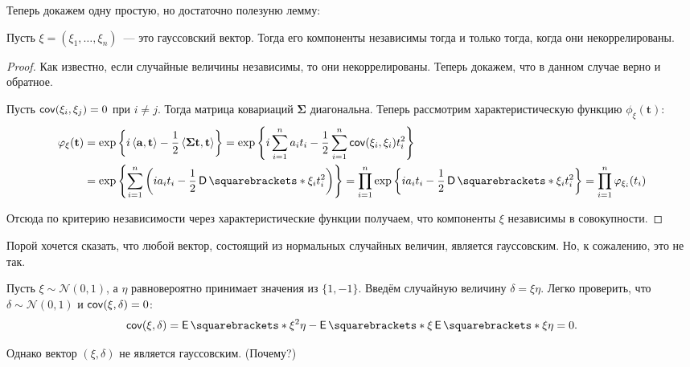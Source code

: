 Теперь докажем одну простую, но достаточно полезуню лемму:
\begin{lemma}
	Пусть \(\xi = (\xi_1, \dots, \xi_n)\)~--- это гауссовский вектор. Тогда его компоненты независимы тогда и только тогда, когда они некоррелированы.
\end{lemma}
\begin{proof}
	Как известно, если случайные величины независимы, то они некоррелированы. Теперь докажем, что в данном случае верно и обратное.
	
	Пусть \(\operatorname{\mathsf{cov}}(\xi_i, \xi_j) = 0\) при \(i \neq j\). Тогда матрица ковариаций \(\mathbf{\Sigma}\) диагональна. Теперь рассмотрим характеристическую функцию \(\phi_{\xi}(\mathbf{t})\):
	\begin{align*}
		\phi_{\xi}(\mathbf{t}) &= \exp\left\{i\left\langle \mathbf{a}, \mathbf{t}\right\rangle - \frac{1}{2}\left\langle \mathbf{\Sigma t}, \mathbf{t}\right\rangle\right\} = \exp\left\{i\sum_{i = 1}^{n}a_i t_i - \frac{1}{2}\sum_{i = 1}^{n}\cov(\xi_i, \xi_i)t_i^2\right\} \\
		&= \exp\left\{\sum_{i = 1}^{n}\left(ia_i t_i - \frac{1}{2}\D{\xi_i}t_i^2\right)\right\} = \prod_{i = 1}^{n} \exp\left\{ia_i t_i - \frac{1}{2}\D{\xi_i}t_i^2\right\} = \prod_{i = 1}^{n} \phi_{\xi_i}(t_i)
	\end{align*}
	
	Отсюда по критерию независимости через характеристические функции получаем, что компоненты \(\xi\) независимы в совокупности.
\end{proof}

Порой хочется сказать, что любой вектор, состоящий из нормальных случайных величин, является гауссовским. Но, к сожалению, это не так.
\begin{example}
	Пусть \(\xi \sim \mathcal{N}(0, 1)\), а \(\eta\) равновероятно принимает значения из \(\{1, -1\}\). Введём случайную величину \(\delta = \xi\eta\). Легко проверить, что \(\delta \sim \mathcal{N}(0, 1)\) и \(\operatorname{\mathsf{cov}}(\xi, \delta) = 0\):
	\[
		\cov(\xi, \delta) = \E{\xi^2\eta} - \E{\xi}\E{\xi\eta} = 0.
	\]
	
	Однако вектор \((\xi, \delta)\) не является гауссовским. (Почему?)
\end{example}

